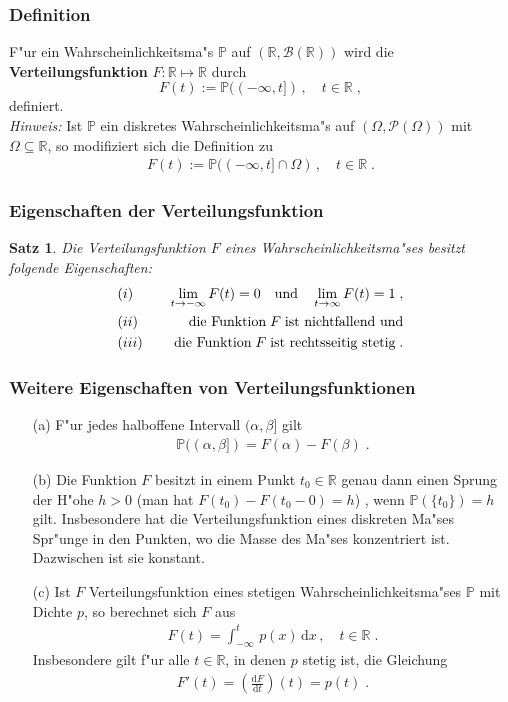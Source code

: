 \documentclass[ngerman,draft,parskip=half,twoside]{scrartcl}
\newtheorem{thm}{Satz}[section]
\newcommand*{\R}{\mathbb{R}}      %
\newcommand*{\BorelM}{\mathcal{B}}  %
\newcommand*{\PotM}{\mathcal{P}}    %
\newcommand*{\WKM}{\mathbb{P}}      %
\begin{document}
\subsubsection{Definition}
F"ur ein Wahrscheinlichkeitsma"s $\WKM$ auf $(\R,\BorelM(\R))$ wird die
\textbf{Verteilungsfunktion} $F\colon\R\mapsto\R$ durch
\begin{equation}
\label{F0}
F(t):=\WKM((-\infty,t])\,,\quad t\in\R  \;,
\end{equation}
definiert.\\
\textit{Hinweis:} Ist $\WKM$ ein diskretes Wahrscheinlichkeitsma"s auf $(\Omega,\PotM(\Omega))$ mit $\Omega\subseteq\R$,
so modifiziert sich die Definition zu
\begin{gather*}
  F(t):=\WKM((-\infty,t]\cap\Omega)\,,\quad t\in\R  \;.
\end{gather*}
\subsubsection{Eigenschaften der Verteilungsfunktion}
\begin{thm}
\label{VF}
Die Verteilungsfunktion $F$ eines Wahrscheinlichkeitsma"ses besitzt folgende Eigenschaften:
\begin{eqnarray*}
&(i)&\quad\lim_{t\to -\infty} F(t)=0\quad\mbox{\rm und}\quad\lim_{t\to\infty} F(t)=1\;,\\
&(ii)&\quad\mbox{\rm die Funktion}\; F\;\mbox{\rm ist nichtfallend und}\\
&(iii)&\quad\mbox{\rm die Funktion}\;
F\;\mbox{\rm ist rechtsseitig stetig}\;.
\end{eqnarray*}
\end{thm}
\subsubsection{Weitere Eigenschaften von Verteilungsfunktionen}
\begin{enumerate}
\item[(a)]
F"ur jedes halboffene Intervall $(\alpha,\beta]$ gilt
  \begin{gather*}
    \WKM((\alpha,\beta])= F(\alpha)-F(\beta)\;.
  \end{gather*}
\item[(b)]
Die Funktion $F$ besitzt in einem Punkt $t_0\in\R$ genau dann einen Sprung der H"ohe
$h>0$ (man hat $F(t_0)-F(t_0-0)=h$) , wenn $\WKM(\{t_0\})=h$ gilt. Insbesondere hat die
Verteilungsfunktion eines diskreten Ma"ses Spr"unge in den Punkten, wo die Masse
des Ma"ses konzentriert ist. Dazwischen ist sie konstant.
\item[(c)]
Ist $F$ Verteilungsfunktion eines stetigen Wahrscheinlichkeitsma"ses $\WKM$ mit Dichte $p$, so berechnet
sich $F$ aus
  \begin{gather*}
    F(t)=\int_{-\infty}^t\,p(x)\,\mathrm d x\,,\quad t\in\R\;.
  \end{gather*}
Insbesondere gilt f"ur alle $t\in\R$, in denen $p$ stetig ist, die Gleichung
  \begin{gather*}
    F'(t)=\left(\frac{\mathrm d F}{\mathrm d t} \right)(t)= p(t)\;.
  \end{gather*}
\end{enumerate}
\end{document}
